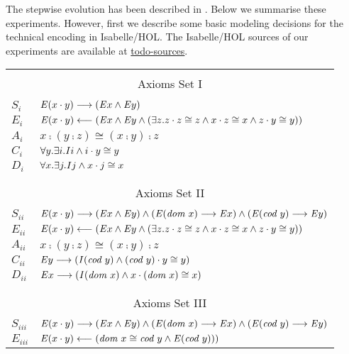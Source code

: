 The stepwise evolution has been described in
\cite{R58}. Below we summarise these experiments.
However, first we describe some basic modeling decisions for the
technical encoding in Isabelle/HOL. The Isabelle/HOL sources of our experiments are
available at \url{todo-sources}.


\begin{table} \centering \normalsize
\begin{tabular}{ll}
\hline
\\
\multicolumn{2}{c}{Axioms Set I} \\
\\
 $S_{i}$ & $\mathit{E}(x \cdot y) \longrightarrow (\mathit{E} x \wedge \mathit{E} y)$ \\
 $E_{i}$ & $\mathit{E}(x \cdot y) \longleftarrow (\mathit{E} x \wedge \mathit{E} y \wedge (\exists z. z \cdot
         z \cong z \wedge x \cdot z \cong x \wedge z \cdot y \cong y))$ \\
 $A_{i}$ & $x\comp (y \comp z) \cong (x \comp y) \comp z$ \\
 $C_{i}$ & $\forall y. \exists i.  \textit{I\/} i \wedge i \cdot y \cong y$ \\
 $D_{i}$ & $\forall x. \exists j.  \textit{I\/} j \wedge x \cdot j \cong x$  \\
\\
\hline
\\
\multicolumn{2}{c}{Axioms Set II} \\
\\
$S_{ii}$ & $\mathit{E}(x \cdot y) \longrightarrow (\mathit{E} x \wedge \mathit{E} y) \wedge (\mathit{E} (\textit{dom \/} x) \longrightarrow \mathit{E}
        x) \wedge (\mathit{E} (\textit{cod \/} y) \longrightarrow \mathit{E}
        y)$ \\
 $E_{ii}$ & $\mathit{E}(x \cdot y) \longleftarrow (\mathit{E} x \wedge \mathit{E} y \wedge (\exists z. z \cdot
         z \cong z \wedge x \cdot z \cong x \wedge z \cdot y \cong y))$ \\
 $A_{ii}$ & $x\comp (y \comp z) \cong (x \comp y) \comp z$ \\
 $C_{ii}$ & $\mathit{E} y \longrightarrow (\textit{I\/}(\textit{cod \/} y) \wedge (\textit{cod \/} y) \cdot y \cong y)$ \\
 $D_{ii}$ & $\mathit{E} x \longrightarrow (\textit{I\/}(\textit{dom \/} x) \wedge x \cdot (\textit{dom \/} x) \cong x)$ \\
\\
\hline
\\
\multicolumn{2}{c}{Axioms Set III} \\
\\
$S_{iii}$ & $\mathit{E}(x \cdot y) \longrightarrow (\mathit{E} x \wedge \mathit{E} y) \wedge (\mathit{E} (\textit{dom \/} x) \longrightarrow \mathit{E}
        x) \wedge (\mathit{E} (\textit{cod \/} y) \longrightarrow \mathit{E}
        y)$ \\
 $E_{iii}$ & $\mathit{E}(x \cdot y) \longleftarrow (\textit{dom \/} x \cong \textit{cod \/} y \wedge \mathit{E} (\textit{cod \/} y)))$ \\

\end{tabular}
\end{table}
